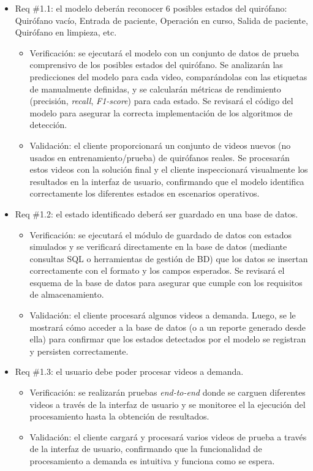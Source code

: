 \documentclass[
11pt, %
]{charter}
\begin{document}
\begin{itemize}
	
	\item Req \#1.1: el modelo deberán reconocer 6 posibles estados del quirófano: Quirófano vacío, Entrada de paciente, Operación en curso, Salida de paciente, Quirófano en limpieza, etc.
	\begin{itemize}
		\item Verificación: se ejecutará el modelo con un conjunto de datos de prueba comprensivo de los posibles estados del quirófano. Se analizarán las predicciones del modelo para cada video, comparándolas con las etiquetas de manualmente definidas, y se calcularán métricas de rendimiento (precisión, \textit{recall}, \textit{F1-score}) para cada estado. Se revisará el código del modelo para asegurar la correcta implementación de los algoritmos de detección.
		\item Validación: el cliente proporcionará un conjunto de videos nuevos (no usados en entrenamiento/prueba) de quirófanos reales. Se procesarán estos videos con la solución final y el cliente inspeccionará visualmente los resultados en la interfaz de usuario, confirmando que el modelo identifica correctamente los diferentes estados en escenarios operativos.
	\end{itemize}
	
	\item Req \#1.2: el estado identificado deberá ser guardado en una base de datos.
	\begin{itemize}
		\item Verificación: se ejecutará el módulo de guardado de datos con estados simulados y se verificará directamente en la base de datos (mediante consultas SQL o herramientas de gestión de BD) que los datos se insertan correctamente con el formato y los campos esperados. Se revisará el esquema de la base de datos para asegurar que cumple con los requisitos de almacenamiento.
		\item Validación: el cliente procesará algunos videos a demanda. Luego, se le mostrará cómo acceder a la base de datos (o a un reporte generado desde ella) para confirmar que los estados detectados por el modelo se registran y persisten correctamente.
	\end{itemize}
	
	\item Req \#1.3: el usuario debe poder procesar videos a demanda.
	\begin{itemize}
		\item Verificación: se realizarán pruebas \textit{end-to-end} donde se carguen diferentes videos a través de la interfaz de usuario y se monitoree el la ejecución del procesamiento hasta la obtención de resultados. 
		\item Validación: el cliente cargará y procesará varios videos de prueba a través de la interfaz de usuario, confirmando que la funcionalidad de procesamiento a demanda es intuitiva y funciona como se espera.
	\end{itemize}
	

\end{itemize}
\end{document}
